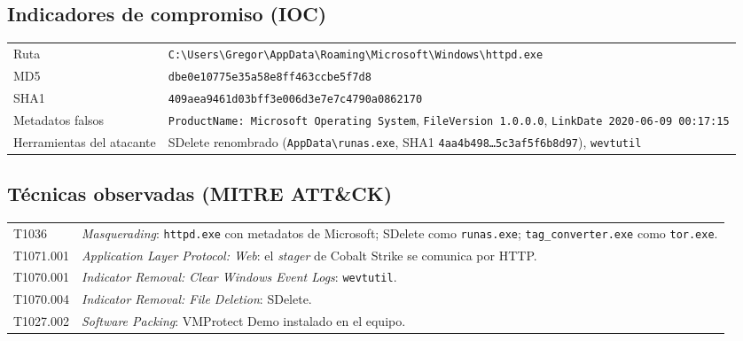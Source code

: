 \documentclass[11pt,a4paper]{article}
\newcommand{\bs}{\textbackslash\allowbreak{}}
\begin{document}
\subsection{Indicadores de compromiso (IOC)}
\begin{tabularx}{\linewidth}{@{}lX@{}}
\toprule
Ruta & \texttt{C:\bs Users\bs Gregor\bs AppData\bs Roaming\bs Microsoft\bs Windows\bs httpd.exe} \\
MD5 & \texttt{dbe0e10775e35a58e8ff463ccbe5f7d8} \\
SHA1 & \texttt{409aea9461d03bff3e006d3e7e7c4790a0862170} \\
Metadatos falsos & \texttt{ProductName: Microsoft Operating System}, \texttt{FileVersion 1.0.0.0}, \texttt{LinkDate 2020-06-09 00:17:15} \\
Herramientas del atacante & SDelete renombrado (\texttt{AppData\bs runas.exe}, SHA1 \texttt{4aa4b498\dots 5c3af5f6b8d97}),
  \texttt{wevtutil} \\
\bottomrule
\end{tabularx}

\subsection{Técnicas observadas (MITRE ATT\&CK)}
\begin{tabularx}{\linewidth}{@{}lX@{}}
\toprule
T1036 & \emph{Masquerading}: \texttt{httpd.exe} con metadatos de Microsoft; SDelete como \texttt{runas.exe};
        \texttt{tag\_converter.exe} como \texttt{tor.exe}. \\
T1071.001 & \emph{Application Layer Protocol: Web}: el \emph{stager} de Cobalt Strike se comunica por HTTP. \\
T1070.001 & \emph{Indicator Removal: Clear Windows Event Logs}: \texttt{wevtutil}. \\
T1070.004 & \emph{Indicator Removal: File Deletion}: SDelete. \\
T1027.002 & \emph{Software Packing}: VMProtect Demo instalado en el equipo. \\
\bottomrule
\end{tabularx}
\end{document}
